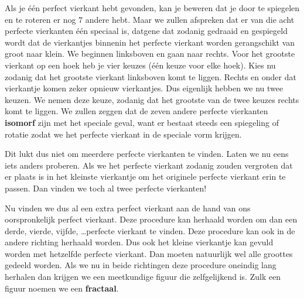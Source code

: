 Als je \'e\'en perfect vierkant hebt gevonden, kan je beweren dat je door te spiegelen en te roteren er nog $7$ andere hebt. Maar we zullen afspreken dat er van die acht perfecte vierkanten \'e\'en speciaal is, datgene dat zodanig gedraaid en gespiegeld wordt dat de vierkantjes binnenin het perfecte vierkant worden gerangschikt van groot naar klein. We beginnen linksboven en gaan naar rechts. Voor het grootste vierkant op een hoek heb je vier keuzes (\'e\'en keuze voor elke hoek). Kies nu zodanig dat het grootste vierkant linksboven komt te liggen. Rechts en onder dat vierkantje komen zeker opnieuw vierkantjes. Dus eigenlijk hebben we nu twee keuzen. We nemen deze keuze, zodanig dat het grootste van de twee keuzes rechts komt te liggen. We zullen zeggen dat de zeven andere perfecte vierkanten {\bf isomorf} zijn met het speciale geval, want er bestaat steeds een spiegeling of rotatie zodat we het perfecte vierkant in de speciale vorm krijgen.



\begin{center}
  
\end{center}

Dit lukt dus niet om meerdere perfecte vierkanten te vinden. Laten we nu eens iets anders proberen. Als we het perfecte vierkant zodanig zouden vergroten dat er plaats is in het kleinste vierkantje om het originele perfecte vierkant erin te passen. Dan vinden we toch al twee perfecte vierkanten!



Nu vinden we dus al een extra perfect vierkant aan de hand van ons oorspronkelijk perfect vierkant. Deze procedure kan herhaald worden om dan een derde, vierde, vijfde, \ldots perfecte vierkant te vinden. Deze procedure kan ook in de andere richting herhaald worden. Dus ook het kleine vierkantje kan gevuld worden met hetzelfde perfecte vierkant. Dan moeten natuurlijk wel alle groottes gedeeld worden. Als we nu in beide richtingen deze procedure oneindig lang herhalen dan krijgen we een meetkundige figuur die zelfgelijkend is. Zulk een figuur noemen we een {\bf fractaal}.


